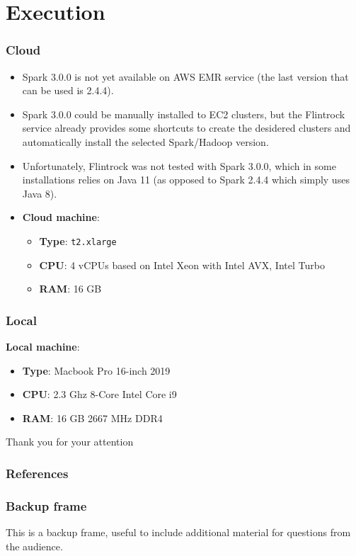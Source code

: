 \documentclass{beamer}
\begin{document}
\section{Execution}
\begin{frame}
  \frametitle{Cloud}
  \begin{itemize}
    \item Spark 3.0.0 is not yet available on AWS EMR service (the last version that can be used is 2.4.4).
    \item Spark 3.0.0 could be manually installed to EC2 clusters, but the Flintrock service already provides some shortcuts to create the desidered clusters and automatically install the selected Spark/Hadoop version.
    \item Unfortunately, Flintrock was not tested with Spark 3.0.0, which in some installations relies on Java 11 (as opposed to Spark 2.4.4 which simply uses Java 8).
    \item \textbf{Cloud machine}: 
    \begin{itemize}
      \item \textbf{Type}: \texttt{t2.xlarge}
      \item \textbf{CPU}: 4 vCPUs based on Intel Xeon with Intel AVX, Intel Turbo
      \item \textbf{RAM}: 16 GB
    \end{itemize}
  \end{itemize}
\end{frame}

\begin{frame}
  \frametitle{Local}
  \textbf{Local machine}:
  \begin{itemize}
    \item \textbf{Type}: Macbook Pro 16-inch 2019
    \item \textbf{CPU}: 2.3 Ghz 8-Core Intel Core i9
    \item \textbf{RAM}: 16 GB 2667 MHz DDR4
  \end{itemize}
\end{frame}


\appendix

\begin{frame}[standout]
	Thank you for your attention
\end{frame}

\begin{frame}
	\frametitle{References}
	\nocite{*}
    
    
\end{frame}

\begin{frame}
	\frametitle{Backup frame}
	This is a backup frame, useful to include additional material for questions from the audience.
\end{frame}
\end{document}
